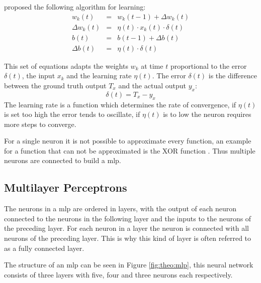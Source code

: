 \cite{hebb1949} proposed the following algorithm for learning:
\begin{eqnarray}
    w_k(t) &=& w_k(t - 1) + \Delta w_k(t) \\
    \Delta w_k(t) &=& \eta(t) \cdot x_k(t) \cdot \delta(t)\\
    b(t) &=& b(t-1) + \Delta b(t) \\
    \Delta b(t) &=& \eta(t) \cdot \delta(t)
\end{eqnarray}

This set of equations adapts the weights $w_k$ at time $t$ proportional to the error $\delta(t)$, the input $x_k$ and the learning rate $\eta(t)$.
The error $\delta(t)$ is the difference between the ground truth output $T_x$ and the actual output $y_x$:
\begin{equation}
    \delta(t) = T_x - y_x
\end{equation}
The learning rate is a function which determines the rate of convergence, if $\eta(t)$ is set too high the error tends to oscillate, if $\eta(t)$ is to low the neuron requires more steps to converge.

For a single neuron it is not possible to approximate every function, an example for a function that can not be approximated is the XOR function \cite{minsky69perceptrons}.
Thus multiple neurons are connected to build a \ac{mlp}.

\subsection{Multilayer Perceptrons}
The neurons in a \acf{mlp} are ordered in layers, with the output of each neuron connected to the neurons in the following layer and the inputs to the neurons of the preceding layer. 
For each neuron in a layer the neuron is connected with all neurons of the preceding layer. 
This is why this kind of layer is often referred to as a fully connected layer. 

The structure of an \ac{mlp} can be seen in Figure \ref{fig:theo:mlp}, this neural network consists of three layers with five, four and three neurons each respectively.

